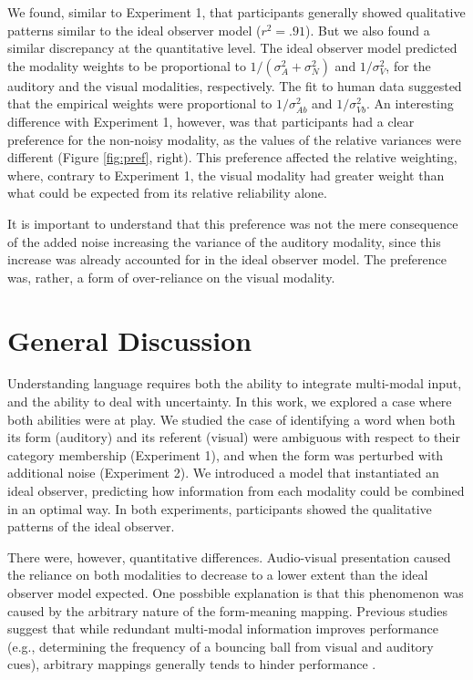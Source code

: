 \documentclass[10pt,letterpaper]{article}
\begin{document}
We found, similar to Experiment 1, that participants generally showed qualitative patterns similar to the ideal observer model ($r^2 = .91$). But we also found a similar discrepancy at the quantitative level. The ideal observer model predicted the modality weights to be proportional to $1/(\sigma^2_{A}+\sigma^2_{N})$ and $1/\sigma^2_{V}$, for the auditory and the visual modalities, respectively. The fit to human data suggested that the empirical weights were proportional to $1/\sigma^2_{Ab}$ and $1/\sigma^2_{Vb}$. An interesting difference with Experiment 1, however, was that participants had a clear preference for the non-noisy modality, as the values of the relative variances were different (Figure \ref{fig:pref}, right). This preference affected the relative weighting, where, contrary to Experiment 1, the visual modality had greater weight than what could be expected from its relative reliability alone.


It is important to understand that this preference was not the mere consequence of the added noise increasing the variance of the auditory modality, since this increase was already accounted for in the ideal observer model. The preference was, rather, a form of over-reliance on the visual modality.

\section{General Discussion}

Understanding language requires both the ability to integrate multi-modal input, and the ability to deal with uncertainty. In this work, we explored a case where both abilities were at play. We studied the case of identifying a word when both its form (auditory) and its referent (visual) were ambiguous with respect to their category membership (Experiment 1), and when the form was perturbed with additional noise (Experiment 2). We introduced a model that instantiated an ideal observer, predicting how information from each modality could be combined in an optimal way. In both experiments, participants showed the qualitative patterns of the ideal observer.

There were, however, quantitative differences. Audio-visual presentation caused the reliance on both modalities to decrease to a lower extent than the ideal observer model expected. One possbible explanation is that this phenomenon was caused by the arbitrary nature of the form-meaning mapping. Previous studies suggest that while redundant multi-modal information improves performance (e.g., determining the frequency of a bouncing ball from visual and auditory cues), arbitrary mappings generally tends to hinder performance \cite<for review, see>{robinson2010}.
\end{document}
